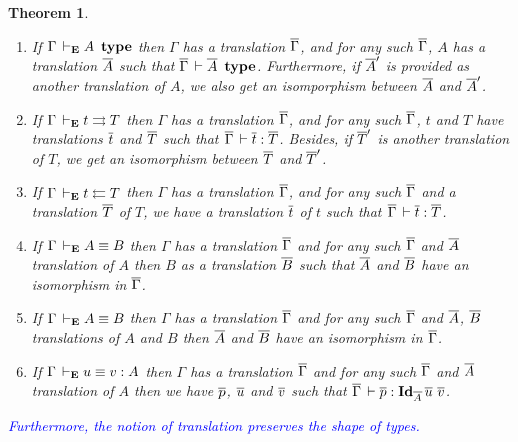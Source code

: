 \documentclass{amsart}
\newcommand\meta[1]{\noindent\textcolor{blue}{\emph{#1}}}
\newtheorem{theorem}{Theorem}[section]
\begin{document}
\begin{theorem}
  \leavevmode
  \begin{enumerate}
    \item If $\Gamma \,\vdash_\mathbf{E} A\ \operatorname{\mathbf{type}}$ then $\Gamma$ has a translation $\overline{\Gamma}$,
    and for any such $\overline{\Gamma}$, $A$ has a translation $\overline{A}$ such that
    $\overline{\Gamma} \,\vdash \overline{A}\ \operatorname{\mathbf{type}}$. Furthermore, if $\overline{A}'$ is provided as another
    translation of $A$, we also get an isomporphism between $\overline{A}$ and
    $\overline{A}'$.
    \item If $\Gamma \,\vdash_\mathbf{E} t \rightrightarrows T$ then $\Gamma$ has a translation $\overline{\Gamma}$,
    and for any such $\overline{\Gamma}$, $t$ and $T$ have translations $\overline{t}$ and $\overline{T}$
    such that $\overline{\Gamma} \,\vdash \overline{t} : \overline{T}$. Besides, if $\overline{T}'$ is another
    translation of $T$, we get an isomorphism between $\overline{T}$ and $\overline{T}'$.
    \item If $\Gamma \,\vdash_\mathbf{E} t \leftleftarrows T$ then $\Gamma$ has a translation $\overline{\Gamma}$,
    and for any such $\overline{\Gamma}$ and a translation $\overline{T}$ of $T$, we have a
    translation $\overline{t}$ of $t$ such that $\overline{\Gamma} \,\vdash \overline{t} : \overline{T}$.
    \item If $\Gamma \,\vdash_\mathbf{E} A \equiv B$ then $\Gamma$ has a translation $\overline{\Gamma}$
    and for any such $\overline{\Gamma}$ and $\overline{A}$ translation of $A$ then $B$ as a
    translation $\overline{B}$ such that $\overline{A}$ and $\overline{B}$ have an isomorphism in
    $\overline{\Gamma}$.
    \item If $\Gamma \,\vdash_\mathbf{E} A \equiv B$ then $\Gamma$ has a translation $\overline{\Gamma}$
    and for any such $\overline{\Gamma}$ and $\overline{A}$, $\overline{B}$ translations of $A$ and $B$
    then $\overline{A}$ and $\overline{B}$ have an isomorphism in $\overline{\Gamma}$.
    \item  If $\Gamma \,\vdash_\mathbf{E} u \equiv v : A$ then $\Gamma$ has a translation
    $\overline{\Gamma}$ and for any such $\overline{\Gamma}$ and $\overline{A}$ translation of $A$ then we
    have $\overline{p}$, $\overline{u}$ and $\overline{v}$ such that
    $\overline{\Gamma} \,\vdash \overline{p} : \mathbf{Id}_{\overline{A}}\,\overline{u}\ \overline{v}$.
  \end{enumerate}
\end{theorem}

\meta{Furthermore, the notion of \emph{translation} preserves the shape of
types.}
\end{document}
